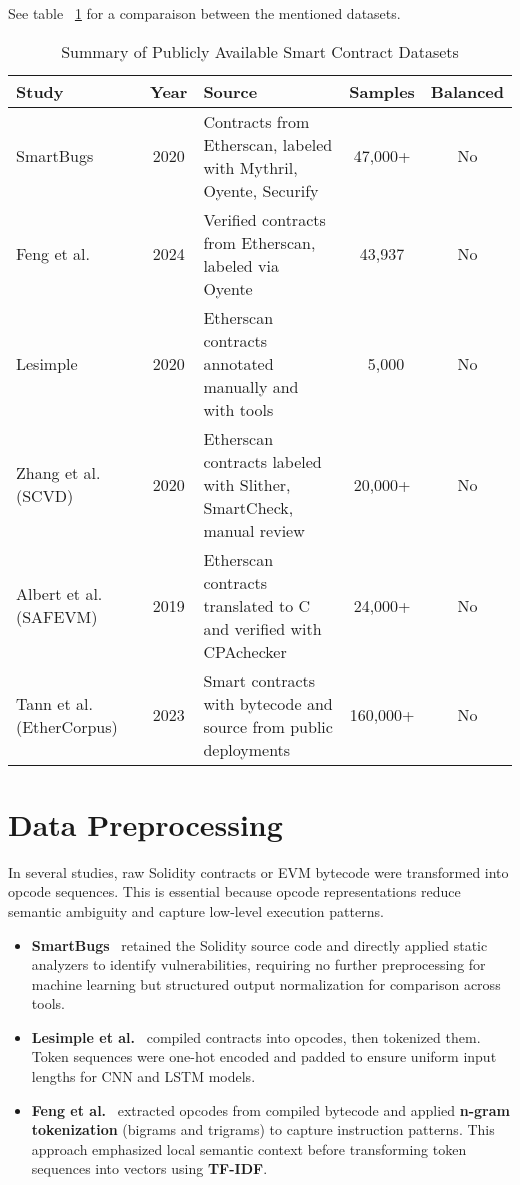See table ~\ref{tab:accurate_smart_contract_datasets} for a comparaison between the mentioned datasets.
\begin{table}[H]
\centering
\label{tab:accurate_smart_contract_datasets}
\begin{tabular}{|l|c|p{6cm}|c|c|}
\hline
\textbf{Study} & \textbf{Year} & \textbf{Source} & \textbf{Samples} & \textbf{Balanced} \\
\hline
SmartBugs~\cite{durieux2020empirical} & 2020 & Contracts from Etherscan, labeled with Mythril, Oyente, Securify & 47,000+ & No \\
\hline
Feng et al.~\cite{feng2024interpretable} & 2024 & Verified contracts from Etherscan, labeled via Oyente & 43,937 & No \\
\hline
Lesimple~\cite{lesimple2020master} & 2020 & Etherscan contracts annotated manually and with tools & ~5,000 & No \\
\hline
Zhang et al. (SCVD)~\cite{zhang2020scvd} & 2020 & Etherscan contracts labeled with Slither, SmartCheck, manual review & 20,000+ & No \\
\hline
Albert et al. (SAFEVM)~\cite{albert2019safevm} & 2019 & Etherscan contracts translated to C and verified with CPAchecker & 24,000+ & No \\
\hline
Tann et al. (EtherCorpus)~\cite{tann2020towards} & 2023 & Smart contracts with bytecode and source from public deployments & 160,000+ & No \\
\hline
\end{tabular}
\caption{Summary of Publicly Available Smart Contract Datasets}
\label{tab:accurate_smart_contract_datasets}

\end{table}

\section{Data Preprocessing}
In several studies, raw Solidity contracts or EVM bytecode were transformed into opcode sequences. This is essential because opcode representations reduce semantic ambiguity and capture low-level execution patterns.

\begin{itemize}
  \item \textbf{SmartBugs}~\cite{durieux2020empirical} retained the Solidity source code and directly applied static analyzers to identify vulnerabilities, requiring no further preprocessing for machine learning but structured output normalization for comparison across tools.
  \item \textbf{Lesimple et al.}~\cite{lesimple2020master} compiled contracts into opcodes, then tokenized them. Token sequences were one-hot encoded and padded to ensure uniform input lengths for CNN and LSTM models.
  \item \textbf{Feng et al.}~\cite{feng2024interpretable} extracted opcodes from compiled bytecode and applied \textbf{n-gram tokenization} (bigrams and trigrams) to capture instruction patterns. This approach emphasized local semantic context before transforming token sequences into vectors using \textbf{TF-IDF}.
\end{itemize}

